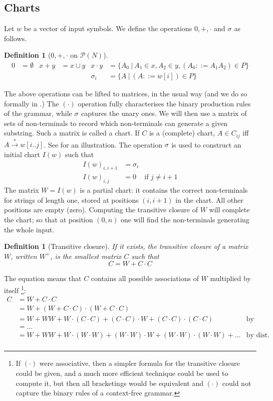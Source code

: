 \documentclass{CSML}
\numberwithin{theorem}{section}
\newtheorem{definition}[theorem]{Definition}
\newcommand{\initial}[1]{I(#1)}
\newcommand{\sing}[1]{σ_{#1}}
\newcommand\powerset[1]{\ensuremath{\mathcal P(#1)}}
\newcommand{\grammarRule}[1]{(#1)}
\newcommand{\generates}[1][]{\stackrel{#1}{\longrightarrow}}
\begin{document}
\subsection{Charts}
Let $w$ be a vector of input symbols.
We define the operations $0,+,\cdot$ and $\sing{}$ as follows.
\begin{definition}[$0,+,\cdot$ on $\powerset N$]
\begin{align*}
  0 & = ∅ &
  x + y & = x \cup y &
  x \cdot y & = \{ A_0 ~|~ A_1 ∈ x, A_2 ∈ y, \grammarRule{A_0 ::= A_1 A_2} ∈ P \} \\
  & & & & \sing i & = \{A ~|~ \grammarRule{A ::= w[i]} ∈ P \}
\end{align*}
\end{definition}
The above operations can be lifted to matrices, in the usual way (and
we do so formally in .)
The $(\cdot)$ operation fully characterises the binary production
rules of the grammar, while $\sing{}$ captures the unary ones.
We will then use a matrix of sets of non-terminals to record which
non-terminals can generate a given substring. Such a matrix is called a chart.
If $C$ is a (complete) chart, $A ∈ C_{ij}$ iff $A \generates[*] w[i..j]$.
See  for an illustration.
The operation $\sing{}$ is used to construct an initial chart $\initial w$ such that
\begin{align*}
  \initial w_{i,i+1} & = \sing i \\
  \initial w_{i,j} & = 0 & \text{if $j ≠ i+1$}
\end{align*}
The matrix $W = \initial w$ is a partial chart:
it contains the correct non-terminals for strings of length one,
stored at positions $(i,i+1)$ in the chart.
All other positions are empty (zero).
Computing the transitive closure of $W$ will complete the chart;
so that at position $(0,n)$ one will find the non-terminals generating
the whole input.
\begin{definition}[Transitive closure]
  If it exists, the transitive closure of a matrix $W$, written $W^+$,
  is the smallest matrix $C$ such that
$$ C = W + C · C$$
\end{definition}
\noindent
The equation means that $C$ contains all possible associations of
$W$ multiplied by itself
\footnote{If $(·)$ were associative, then a simpler formula for the
  transitive closure could be given, and a much more efficient
  technique could be used to compute it, but then all bracketings
  would be equivalent and $(·)$ could not capture the binary rules of
  a context-free grammar.}:
\begin{align*}
C & = W + C · C \\
  & = W + (W + C · C) · (W + C · C) \\
  & = W + WW + W·(C·C) + (C·C)·W + (C · C)·(C · C)&\!\!\!\!\!\!\text{by distributivity}\\
  & = \ldots \\
  & = W + WW + W·(W·W) + (W·W)·W + (W · W)·(W · W) + \ldots &\!\!\!\text{by dist.\ \& comm.}\\
\end{align*}
\end{document}
